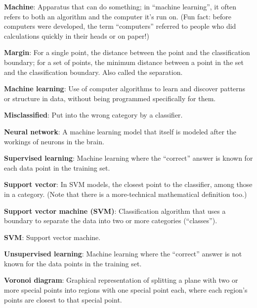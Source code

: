 \documentclass[
]{book}
\begin{document}
\textbf{Machine}: Apparatus that can do something; in ``machine learning'', it often refers to both an algorithm and the computer it's run on. (Fun fact: before computers were developed, the term ``computers'' referred to people who did calculations quickly in their heads or on paper!)

\textbf{Margin}: For a single point, the distance between the point and the classification boundary; for a set of points, the minimum distance between a point in the set and the classification boundary. Also called the separation.

\textbf{Machine learning}: Use of computer algorithms to learn and discover patterns or structure in data, without being programmed specifically for them.

\textbf{Misclassified}: Put into the wrong category by a classifier.

\textbf{Neural network}: A machine learning model that itself is modeled after the workings of neurons in the brain.

\textbf{Supervised learning}: Machine learning where the ``correct'' answer is known for each data point in the training set.

\textbf{Support vector}: In SVM models, the closest point to the classifier, among those in a category. (Note that there is a more-technical mathematical definition too.)

\textbf{Support vector machine (SVM)}: Classification algorithm that uses a boundary to separate the data into two or more categories (``classes'').

\textbf{SVM}: Support vector machine.

\textbf{Unsupervised learning}: Machine learning where the ``correct'' answer is not known for the data points in the training set.

\textbf{Voronoi diagram}: Graphical representation of splitting a plane with two or more special points into regions with one special point each, where each region's points are closest to that special point.
\end{document}
